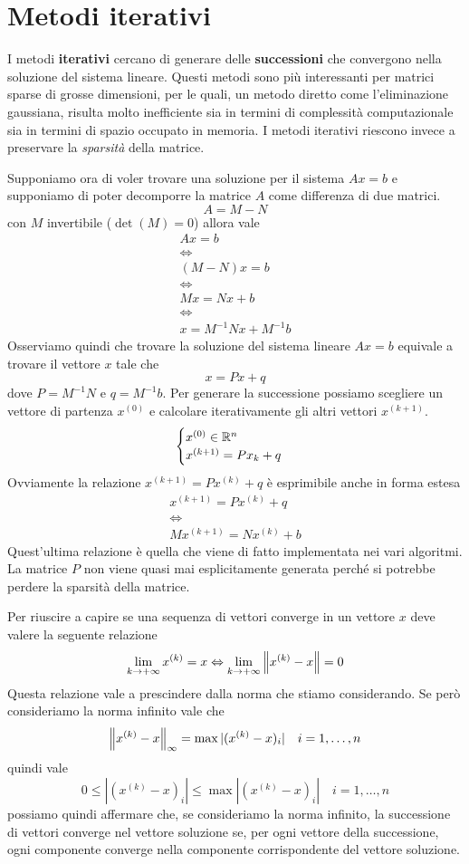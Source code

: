 \chapter{Metodi iterativi}
I metodi \textbf{iterativi} cercano di generare delle \textbf{successioni} che convergono nella soluzione
del sistema lineare. Questi metodi sono più interessanti per matrici sparse di grosse dimensioni, per le quali,
un metodo diretto come l'eliminazione gaussiana, risulta molto inefficiente sia in termini di complessità
computazionale sia in termini di spazio occupato in memoria. I metodi iterativi riescono invece a preservare la
\emph{sparsità} della matrice.

Supponiamo ora di voler trovare una soluzione per il sistema $Ax = b$ e supponiamo di poter decomporre la matrice
$A$ come differenza di due matrici.
\[ A = M - N \]
con $M$ invertibile ($\det(M) = 0$) allora vale
\begin{gather*}
	Ax = b \\
	\Leftrightarrow \\
	(M - N) x = b \\
	\Leftrightarrow \\
	M x = N x + b \\
	\Leftrightarrow \\
	x = M^{-1} N x + M^{-1} b
\end{gather*}
Osserviamo quindi che trovare la soluzione del sistema lineare $Ax = b$ equivale a trovare il vettore $x$ tale che
\[ x = Px + q \]
dove $P = M^{-1} N$ e $q = M^{-1} b$. Per generare la successione possiamo scegliere un vettore di partenza
$x^{(0)}$ e calcolare iterativamente gli altri vettori $x^{(k+1)}$.
\[
	\begin{cases}
		x^{(0)} \in \mathbb{R}^n \\
		x^{(k+1)} = P x_k + q
	\end{cases}
\]
Ovviamente la relazione $x^{(k+1)} = P x^{(k)} + q$ è esprimibile anche in forma estesa
\begin{gather*}
	x^{(k+1)} = P x^{(k)} + q \\
	\Leftrightarrow         \\
	M x^{(k+1)} = N x^{(k)} + b
\end{gather*}
Quest'ultima relazione è quella che viene di fatto implementata nei vari algoritmi. La matrice $P$ non viene quasi
mai esplicitamente generata perché si potrebbe perdere la sparsità della matrice.

Per riuscire a capire se una sequenza di vettori converge in un vettore $x$ deve valere la seguente relazione
\[ \lim_{k \to +\infty} x^{(k)} = x \Leftrightarrow \lim_{k \to +\infty} \left\lVert x^{(k)} - x\right\rVert = 0 \]
Questa relazione vale a prescindere dalla norma che stiamo considerando. Se però consideriamo la norma infinito
vale che
\[ \left\lVert x^{(k)} - x\right\rVert_\infty = \max | (x^{(k)} - x)_i | \quad i = 1, \dots, n \]
quindi vale
\[ 0 \leq | (x^{(k)} - x)_i | \leq \max | (x^{(k)} - x)_i | \quad i = 1, \dots, n \]
possiamo quindi affermare che, se consideriamo la norma infinito, la successione di vettori converge nel vettore
soluzione se, per ogni vettore della successione, ogni componente converge nella componente corrispondente del
vettore soluzione.

